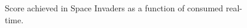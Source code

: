 \documentclass[11pt]{article}
\begin{document}
\begin{figure}[H]
    \centering
    \caption{Score achieved in Space Invaders as a function of
    consumed real-time.}
    \label{fig:results_baseline_potato}
\end{figure}
\end{document}
